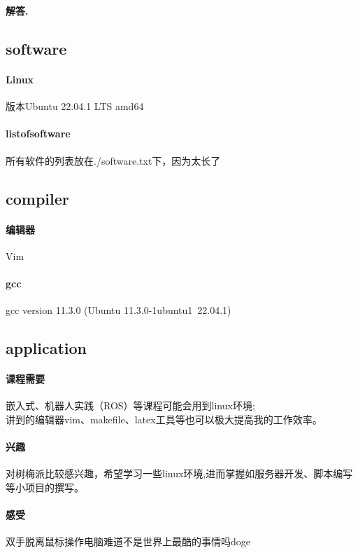 \documentclass[12pt, a4paper, oneside]{ctexart}
\newenvironment{solution}{\par\noindent\textbf{解答. }}{\\\par}
\begin{document}
\begin{solution}
	\subsection{software}
		\paragraph{Linux}
			版本Ubuntu 22.04.1 LTS amd64
		\paragraph{listofsoftware}
			所有软件的列表放在./software.txt下，因为太长了


	\subsection{compiler}
		\paragraph{编辑器}
			Vim\\
		\paragraph{gcc}
			gcc version 11.3.0 (Ubuntu 11.3.0-1ubuntu1~22.04.1)\\
		
	\subsection{application}
		\paragraph{课程需要}
	嵌入式、机器人实践（ROS）等课程可能会用到linux环境;\\
	讲到的编辑器vim、makefile、latex工具等也可以极大提高我的工作效率。\\
		\paragraph{兴趣}
			对树梅派比较感兴趣，希望学习一些linux环境,进而掌握如服务器开发、脚本编写等小项目的撰写。\\
		\paragraph{感受}
			双手脱离鼠标操作电脑难道不是世界上最酷的事情吗doge\\
\end{solution}
\end{document}
